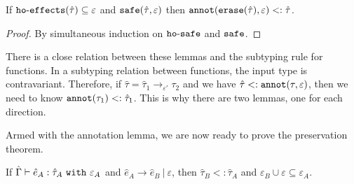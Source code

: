 \begin{lemma}
If $\mathtt{ho \hbox{-} effects}(\hat \tau) \subseteq \varepsilon$ and $\mathtt{safe}(\hat \tau, \varepsilon)$ then $\mathtt{annot(erase}(\hat \tau), \varepsilon) <: \hat \tau$.
\end{lemma}

\begin{proof}
By simultaneous induction on $\mathtt{ho \hbox{-} safe}$ and $\mathtt{safe}$.
\end{proof}

\noindent
There is a close relation between these lemmas and the subtyping rule for functions. In a subtyping relation between functions, the input type is contravariant. Therefore, if $\hat \tau = \hat \tau_1 \rightarrow_{\varepsilon'} \tau_2$ and we have $\hat \tau <: \mathtt{annot}(\tau, \varepsilon)$, then we need to know $\mathtt{annot}(\tau_1) <: \hat \tau_1$. This is why there are two lemmas, one for each direction.

Armed with the annotation lemma, we are now ready to prove the preservation theorem.

\begin{theorem}[Preservation]
If $\hat \Gamma \vdash \hat e_A: \hat \tau_A~\mathtt{with}~ \varepsilon_A$ and $\hat e_A \longrightarrow \hat e_B~|~\varepsilon$, then $\hat \tau_B <: \hat \tau_A$ and $\varepsilon_B \cup \varepsilon \subseteq \varepsilon_A$.
\end{theorem}

